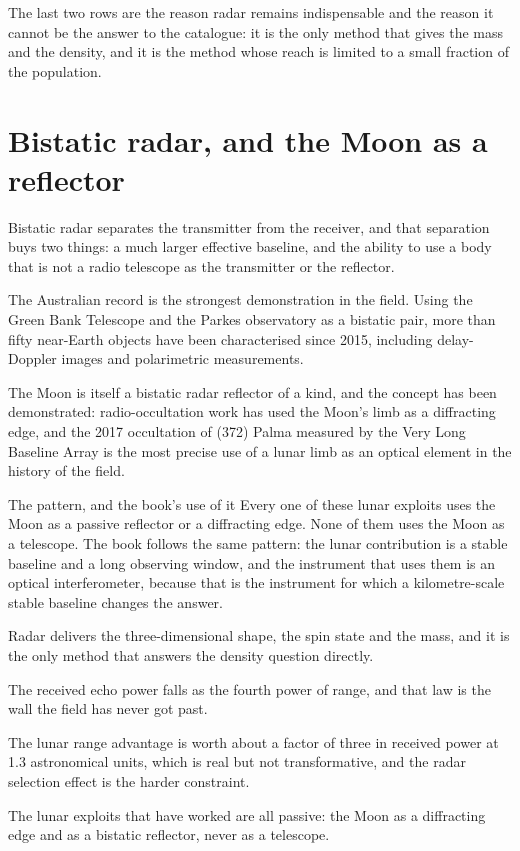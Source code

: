 The last two rows are the reason radar remains indispensable and the reason
it cannot be the answer to the catalogue: it is the only method that gives
the mass and the density, and it is the method whose reach is limited to a
small fraction of the population.

\section{Bistatic radar, and the Moon as a reflector}

Bistatic radar separates the transmitter from the receiver, and that
separation buys two things: a much larger effective baseline, and the
ability to use a body that is not a radio telescope as the transmitter or the
reflector.

The Australian record is the strongest demonstration in the field. Using the
Green Bank Telescope and the Parkes observatory as a bistatic pair, more than
fifty near-Earth objects have been characterised since 2015, including
delay-Doppler images and polarimetric measurements.

The Moon is itself a bistatic radar reflector of a kind, and the concept has
been demonstrated: radio-occultation work has used the Moon's limb as a
diffracting edge, and the 2017 occultation of (372) Palma measured by the
Very Long Baseline Array is the most precise use of a lunar limb as an
optical element in the history of the field.

\begin{seamnote}{The pattern, and the book's use of it}
Every one of these lunar exploits uses the Moon as a passive reflector or a
diffracting edge. None of them uses the Moon as a telescope. The book follows
the same pattern: the lunar contribution is a stable baseline and a long
observing window, and the instrument that uses them is an optical
interferometer, because that is the instrument for which a kilometre-scale
stable baseline changes the answer.
\end{seamnote}

\begin{keytakeaways}
\item Radar delivers the three-dimensional shape, the spin state and the mass,
and it is the only method that answers the density question directly.
\item The received echo power falls as the fourth power of range, and that
law is the wall the field has never got past.
\item The lunar range advantage is worth about a factor of three in received
power at 1.3 astronomical units, which is real but not transformative, and
the radar selection effect is the harder constraint.
\item The lunar exploits that have worked are all passive: the Moon as a
diffracting edge and as a bistatic reflector, never as a telescope.
\end{keytakeaways}
